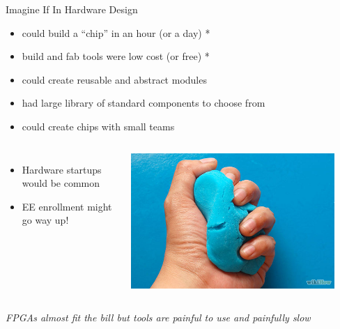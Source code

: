 \documentclass[xcolor=pdflatex,dvipsnames,table]{beamer}
\begin{document}
\begin{frame}[fragile]{Imagine If In Hardware Design}
\begin{itemize}
\item could build a ``chip'' in an hour (or a day) *
\item build and fab tools were low cost (or free) *
\item could create reusable and abstract modules
\item had large library of standard components to choose from
\item could create chips with small teams
\end{itemize}
\begin{columns}
\begin{itemize}
\item {\color{red}Hardware startups would be common}
\item {\color{red}EE enrollment might go way up!}
\end{itemize}
\begin{center}
\includegraphics[width=0.9\textwidth]{figs/clay-power.jpg}
\end{center}
\end{columns}
\vspace{1cm}
{\it\small * FPGAs almost fit the bill but tools are painful to use and painfully slow}
\end{frame}


\end{document}
